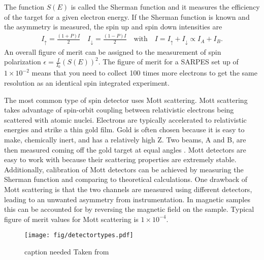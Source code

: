 \documentclass[12pt]{article}
\begin{document}
The function $S(E)$ is called the Sherman function and it measures the efficiency of the target for a given electron energy.
If the Sherman function is known and the asymmetry is measured, the spin up and spin down intensities are
\begin{align}
  I_{\uparrow}=\frac{(1+P)I}{2}\quad I_{\downarrow}=\frac{(1-P)I}{2}\quad \text{with}\quad I=I_{\uparrow}+I_{\downarrow}\propto I_A+I_B\text{.}
\end{align}
An overall figure of merit can be assigned to the measurement of spin polarization $\epsilon=\frac{I}{I_0}(S(E))^2$.
The figure of merit for a SARPES set up of $1\times10^{-2}$ means that you need to collect 100 times more electrons to get the same resolution as an identical spin integrated experiment.

The most common type of spin detector uses Mott scattering.
Mott scattering takes advantage of spin-orbit coupling between relativistic electrons being scattered with atomic nuclei.
Electrons are typically accelerated to relativistic energies and strike a thin gold film.
Gold is often chosen because it is easy to make, chemically inert, and has a relatively high Z.
Two beams, A and B, are then measured coming off the gold target at equal angles \cite{Hoesch}.
Mott detectors are easy to work with because their scattering properties are extremely stable.
Additionally, calibration of Mott detectors can be achieved by measuring the Sherman function and comparing to theoretical calculations.
One drawback of Mott scattering is that the two channels are measured using different detectors, leading to an unwanted asymmetry from instrumentation\cite{Okuda-Kimura}.
In magnetic samples this can be accounted for by reversing the magnetic field on the sample.
Typical figure of merit values for Mott scattering is $1\times10^{-4}$.

\begin{figure}[h]
  \centering
  \texttt{[image: fig/detectortypes.pdf]}
  \caption[should I put this here?]
  {caption needed Taken from \cite{Okuda-Kimura}}
  \label{fig:asymmetry}
\end{figure}
\end{document}
